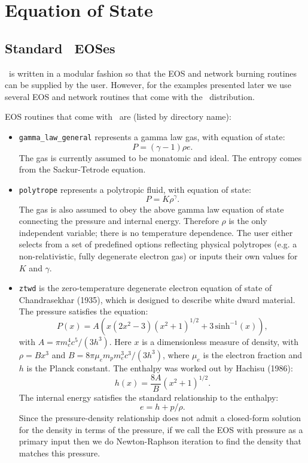 \section{Equation of State}

\subsection{Standard \castro\ EOSes}

\castro\ is written in a modular fashion so that the EOS and network
burning routines can be supplied by the user.   However, for the
examples presented later we use several EOS and network routines
that come with the \castro\ distribution.  

EOS routines that come with \castro\ are (listed by directory name):
\begin{itemize}

\item {\tt gamma\_law\_general} represents a gamma law gas, with equation of state:
\begin{equation}
  P = (\gamma - 1) \rho e.
\end{equation}
The gas is currently assumed to be monatomic and ideal. The entropy comes from the Sackur-Tetrode equation.

\item {\tt polytrope} represents a polytropic fluid, with equation of state:
\begin{equation}
  P = K \rho^\gamma.
\end{equation}
The gas is also assumed to obey the above gamma law equation of state
connecting the pressure and internal energy. Therefore $\rho$ is the
only independent variable; there is no temperature dependence. The
user either selects from a set of predefined options reflecting
physical polytropes (e.g. a non-relativistic, fully degenerate
electron gas) or inputs their own values for $K$ and $\gamma$.

\item {\tt ztwd} is the zero-temperature degenerate electron equation of state 
of Chandrasekhar (1935), which is designed to describe white dward material. The 
pressure satisfies the equation:
\begin{equation}
  P(x) = A \left( x(2x^2-3)(x^2 + 1)^{1/2} + 3\, \text{sinh}^{-1}(x) \right),
\end{equation}
with $A = \pi m_e^4 c^5 / (3 h^3)$. Here $x$ is a dimensionless measure of density,
with $\rho = B x^3$ and $B = 8\pi \mu_e m_p m_e^3 c^3 / (3h^3)$, 
where $\mu_e$ is the electron fraction and $h$ is the Planck constant. The enthalpy 
was worked out by Hachisu (1986):
\begin{equation}
  h(x) = \frac{8A}{B}\left(x^2 + 1\right)^{1/2}.
\end{equation}
The internal energy satisfies the standard relationship to the enthalpy:
\begin{equation}
  e = h + p / \rho.
\end{equation}
Since the pressure-density relationship does not admit a closed-form 
solution for the density in terms of the pressure, if we call the EOS 
with pressure as a primary input then we do Newton-Raphson iteration 
to find the density that matches this pressure.


\end{itemize}

